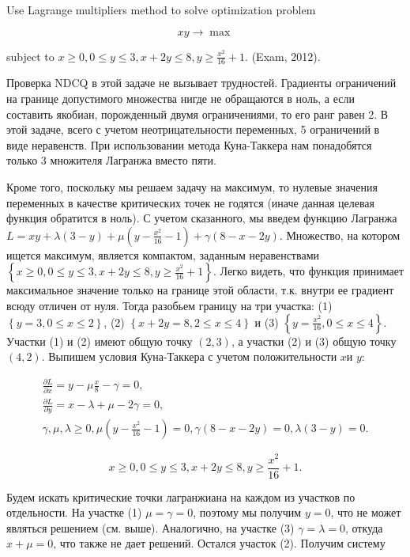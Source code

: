 \begin{problem}
Use Lagrange multipliers method to solve optimization problem

\[xy\to \max \]

subject to $x\ge 0,  0\le y\le 3,  x+2y\le 8,  y\ge \frac{x^{2} }{16} +1$. (Exam, 2012).


\begin{sol}
Проверка NDCQ в этой задаче не вызывает трудностей. Градиенты ограничений на границе допустимого множества нигде не обращаются в ноль, а если составить якобиан, порожденный двумя ограничениями, то его ранг равен 2. В этой задаче, всего с учетом неотрицательности переменных, 5 ограничений в виде неравенств. При использовании метода Куна-Таккера нам понадобятся только 3 множителя Лагранжа  вместо пяти.


Кроме того, поскольку мы решаем задачу на максимум, то нулевые значения переменных в качестве критических точек не годятся (иначе данная целевая функция обратится в ноль). С учетом сказанного, мы введем функцию Лагранжа $L=xy+\lambda (3-y)+\mu (y-\frac{x^{2} }{16} -1)+\gamma (8-x-2y)$. Множество, на котором ищется максимум, является компактом, заданным неравенствами $\left\{\right. x\ge 0,  0\le y\le 3,  x+2y\le 8,  y\ge \frac{x^{2} }{16} +1\left. \right\}$. Легко видеть, что функция принимает максимальное значение только на границе этой области, т.к. внутри ее градиент всюду отличен от нуля. Тогда разобьем границу на три участка: (1) $\left\{y=3,  0\le x\le 2\right\}$, (2) $\left\{x+2y=8,  2\le x\le 4\right\}$ и (3) $\left\{y=\frac{x^{2} }{16} ,  0\le x\le 4\right\}$. Участки (1) и (2) имеют общую точку $(2,3)$, а участки (2) и (3) общую точку $(4,2)$. Выпишем условия Куна-Таккера с учетом положительности $x$и $y$:

\[\begin{array}{l} {\frac{\partial L}{\partial x} =y-\mu \frac{x}{8} -\gamma =0,} \\ {\frac{\partial L}{\partial y} =x-\lambda +\mu -2\gamma =0,} \\ {\gamma ,\mu ,\lambda \ge 0,  \mu (y-\frac{x^{2} }{16} -1)=0,  \gamma (8-x-2y)=0,  \lambda (3-y)=0.} \end{array}\]

\[x\ge 0,  0\le y\le 3,  x+2y\le 8,  y\ge \frac{x^{2} }{16} +1.\]

Будем искать критические точки лагранжиана на каждом из участков по отдельности. На участке (1) $\mu =\gamma =0$, поэтому мы получим $y=0$, что не может являться решением (см. выше). Аналогично, на участке (3)  $\gamma =\lambda =0$, откуда $x+\mu =0$, что также не дает решений. Остался участок (2).  Получим систему


\end{sol}
\end{problem}
